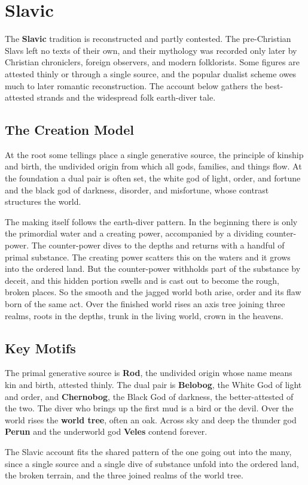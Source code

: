 \section{Slavic}

The \textbf{Slavic} tradition is reconstructed and partly contested. The pre-Christian Slavs left no texts of their own, and their mythology was recorded only later by Christian chroniclers, foreign observers, and modern folklorists. Some figures are attested thinly or through a single source, and the popular dualist scheme owes much to later romantic reconstruction. The account below gathers the best-attested strands and the widespread folk earth-diver tale.

\subsection{The Creation Model}

At the root some tellings place a single generative source, the principle of kinship and birth, the undivided origin from which all gods, families, and things flow. At the foundation a dual pair is often set, the white god of light, order, and fortune and the black god of darkness, disorder, and misfortune, whose contrast structures the world.

The making itself follows the earth-diver pattern. In the beginning there is only the primordial water and a creating power, accompanied by a dividing counter-power. The counter-power dives to the depths and returns with a handful of primal substance. The creating power scatters this on the waters and it grows into the ordered land. But the counter-power withholds part of the substance by deceit, and this hidden portion swells and is cast out to become the rough, broken places. So the smooth and the jagged world both arise, order and its flaw born of the same act. Over the finished world rises an axis tree joining three realms, roots in the depths, trunk in the living world, crown in the heavens.

\subsection{Key Motifs}

The primal generative source is \textbf{Rod}, the undivided origin whose name means kin and birth, attested thinly. The dual pair is \textbf{Belobog}, the White God of light and order, and \textbf{Chernobog}, the Black God of darkness, the better-attested of the two. The diver who brings up the first mud is a bird or the devil. Over the world rises the \textbf{world tree}, often an oak. Across sky and deep the thunder god \textbf{Perun} and the underworld god \textbf{Veles} contend forever.

The Slavic account fits the shared pattern of the one going out into the many, since a single source and a single dive of substance unfold into the ordered land, the broken terrain, and the three joined realms of the world tree.
